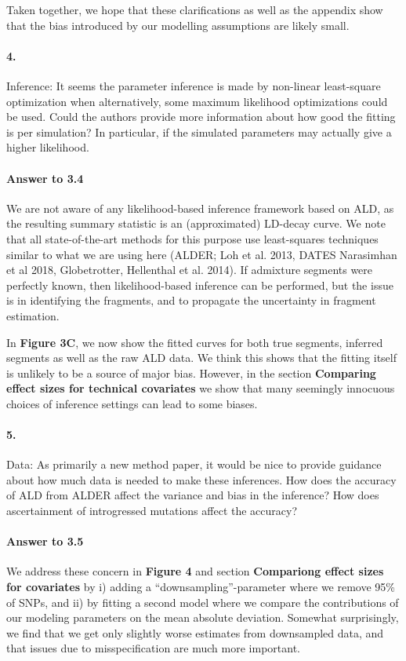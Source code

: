 \documentclass[11pt]{article}
\let\oldparagraph\paragraph
\renewcommand{\paragraph}[1]{\oldparagraph{#1}\mbox{}}
\begin{document}
Taken together, we hope that these clarifications as well as the appendix show that the bias introduced by our modelling assumptions are likely small.

\paragraph{4.}
Inference: It seems the parameter inference is made by non-linear least-square optimization when alternatively, some maximum likelihood optimizations could be used. Could the authors provide more information about how good the fitting is per simulation? In particular, if the simulated parameters may actually give a higher likelihood.

\paragraph{Answer to 3.4}
We are not aware of any likelihood-based inference framework based on ALD, as the resulting summary statistic is an (approximated) LD-decay curve. We  note that all state-of-the-art methods for this purpose use least-squares techniques similar to what we are using here (ALDER; Loh et al. 2013, DATES Narasimhan et al 2018, Globetrotter, Hellenthal et al. 2014). If admixture segments were perfectly known, then likelihood-based inference can be performed, but the issue is in identifying the fragments, and to propagate the uncertainty in fragment estimation.

In \textbf{Figure 3C}, we now show the fitted curves for both true segments, inferred segments as well as the raw ALD data. We think this shows that the fitting itself is unlikely to be a source of major bias. However, in the section \textbf{Comparing effect sizes for technical covariates} we show that many seemingly innocuous choices of inference settings can lead to some biases.

\paragraph{5.} 
Data: As primarily a new method paper, it would be nice to provide guidance about how much data is needed to make these inferences. 
How does the accuracy of ALD from ALDER affect the variance and bias in the inference? 
How does ascertainment of introgressed mutations affect the accuracy? 

\paragraph{Answer to 3.5}
We address these concern in \textbf{Figure 4} and section \textbf{Compariong effect sizes for covariates} by i) adding a ``downsampling''-parameter where we remove 95\% of SNPs, and ii) by fitting a second model where we compare the contributions of our modeling parameters on the mean absolute deviation. Somewhat surprisingly, we find that we get only slightly worse estimates from downsampled data, and that issues due to misspecification are much more important. 
\end{document}
